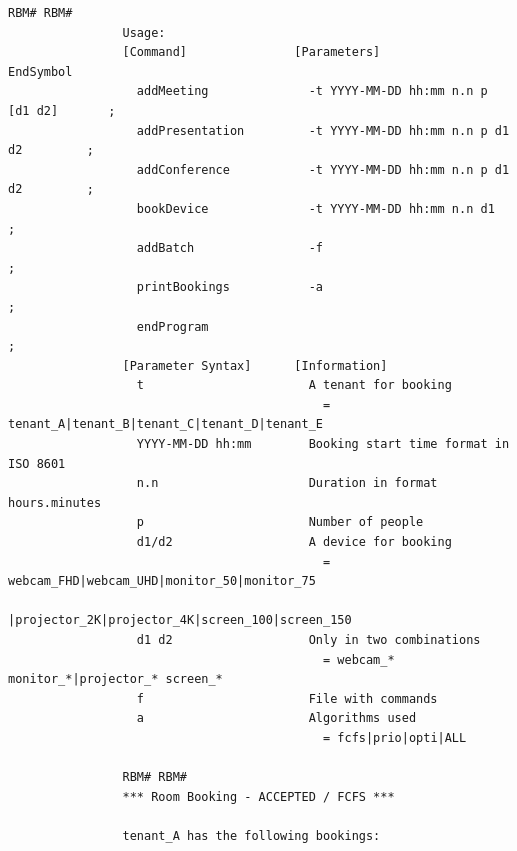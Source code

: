 \documentclass{article}
\begin{document}
\begin{Verbatim}[gobble=8]
                RBM# RBM#
                Usage: 
                [Command]               [Parameters]                            EndSymbol     
                  addMeeting              -t YYYY-MM-DD hh:mm n.n p [d1 d2]       ;           
                  addPresentation         -t YYYY-MM-DD hh:mm n.n p d1 d2         ;           
                  addConference           -t YYYY-MM-DD hh:mm n.n p d1 d2         ;           
                  bookDevice              -t YYYY-MM-DD hh:mm n.n d1              ;           
                  addBatch                -f                                      ;           
                  printBookings           -a                                      ;           
                  endProgram                                                      ;           
                [Parameter Syntax]      [Information]                                         
                  t                       A tenant for booking                                
                                            = tenant_A|tenant_B|tenant_C|tenant_D|tenant_E    
                  YYYY-MM-DD hh:mm        Booking start time format in ISO 8601               
                  n.n                     Duration in format hours.minutes                    
                  p                       Number of people                                    
                  d1/d2                   A device for booking                                
                                            = webcam_FHD|webcam_UHD|monitor_50|monitor_75     
                                              |projector_2K|projector_4K|screen_100|screen_150
                  d1 d2                   Only in two combinations                            
                                            = webcam_* monitor_*|projector_* screen_*         
                  f                       File with commands                                  
                  a                       Algorithms used                                     
                                            = fcfs|prio|opti|ALL                              
                
                RBM# RBM# 
                *** Room Booking - ACCEPTED / FCFS ***
                
                tenant_A has the following bookings:
                

\end{Verbatim}
\end{document}
